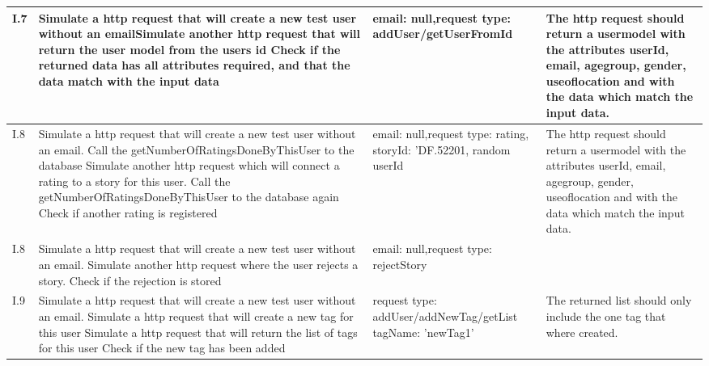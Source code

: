 {{\begin{center}
\begin{longtable}{ | p{1cm} | p{6.5cm} | p{3cm} | p{6.5cm} |}
			I.7 & Simulate a http request that will create a new test user without an email\newline  Simulate another http request that will return the user model from the users id \newline Check if the returned data has all attributes required, and that the data match with the input data & email: null,\newline request type: addUser/getUserFromId  & The http request should return a usermodel with the attributes userId, email, age\textunderscore group, gender, use\textunderscore of\textunderscore location and with the data which match the input data.  \\ \hline
			
			I.8 & Simulate a http request that will create a new test user without an email. \newline Call the getNumberOfRatingsDoneByThisUser to the database \newline  Simulate another http request which will connect a rating to a story for this user.  \newline Call the getNumberOfRatingsDoneByThisUser to the database again \newline Check if another rating is registered & email: null,\newline request type: rating, storyId: 'DF.52201, random userId  & The http request should return a usermodel with the attributes userId, email, age\textunderscore group, gender, use\textunderscore of\textunderscore location and with the data which match the input data.  \\ \hline
			
			I.8 & Simulate a http request that will create a new test user without an email. \newline  \newline  Simulate another http request where the user rejects a story.  \newline  \newline Check if the rejection is stored & email: null,\newline request type: rejectStory  &   \\ \hline

			I.9 & Simulate a http request that will create a new test user without an email. \newline  Simulate a http request that will create a new tag for this user \newline Simulate a http request that will return the list of tags for this user \newline Check if the new tag has been added  & request type: addUser/addNewTag/getList  tagName: 'newTag1' & The returned list should only include the one tag that where created. \\ \hline
			

\end{longtable}
\end{center}}}
